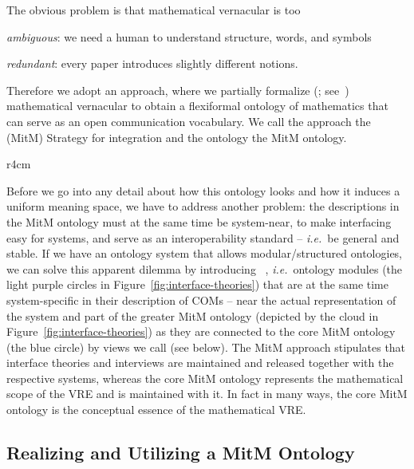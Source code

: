 The obvious problem is that mathematical vernacular is too 
\begin{inparaenum}[\em i\rm)]
\item \emph{ambiguous}: we need a human to understand structure, words, and symbols
\item \emph{redundant}: every paper introduces slightly different notions. 
\end{inparaenum}
Therefore we adopt an approach, where we partially formalize (;
see~\cite{Kohlhase:tffm13}) mathematical vernacular to obtain a flexiformal ontology of
mathematics that can serve as an open communication vocabulary. We call the approach the
 (MitM) Strategy for integration and the ontology the MitM
ontology.
\begin{wrapfigure}r{4cm}\vspace*{-1.5em}
  \vspace*{-.5em}
  \caption{Interface theories}\label{fig:interface-theories}\vspace*{-1em}
\end{wrapfigure}
Before we go into any detail about how this ontology looks and how it induces a uniform
meaning space, we have to address another problem: the descriptions in the MitM ontology
must at the same time be system-near, to make interfacing easy for systems, and serve as
an interoperability standard -- \emph{i.e.}\ be general and stable. If we have an ontology system
that allows modular/structured ontologies, we can solve this apparent dilemma by
introducing ~\cite{KohRabSac:fvip11}, \emph{i.e.}\ ontology modules
(the light purple circles in Figure~\ref{fig:interface-theories}) that are at the same
time system-specific in their description of COMs -- near the actual representation of the
system and part of the greater MitM ontology (depicted by the cloud in
Figure~\ref{fig:interface-theories}) as they are connected to the core MitM ontology (the
blue circle) by views we call  (see below). The MitM approach
stipulates that interface theories and interviews are maintained and released together with
the respective systems, whereas the core MitM ontology represents the mathematical scope
of the VRE and is maintained with it. In fact in many ways, the core MitM ontology is the
conceptual essence of the mathematical VRE.

\subsection{Realizing and Utilizing a MitM Ontology}

